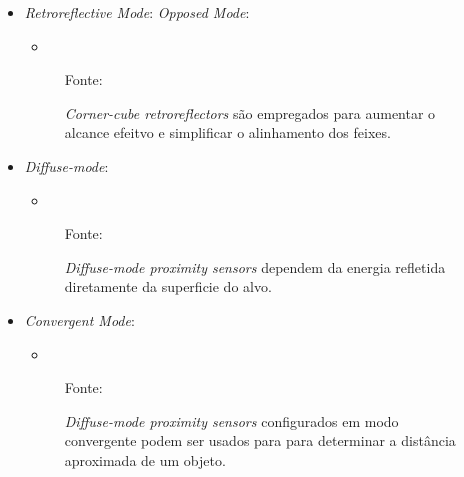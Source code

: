 \documentclass[xcolor=dvipsnames, aspectratio=169]{beamer}
\begin{document}
\begin{frame}
\begin{itemize}
		\newpage
		\item \textit{Retroreflective Mode}:
		\textit{Opposed Mode}:
		\begin{itemize}
			\item 
		\end{itemize}
		\begin{figure}
			\centering
			{Fonte: \cite{everett1995sensors}}
			\caption{\textit{Corner-cube retroreflectors} são empregados para aumentar o alcance efeitvo e simplificar o alinhamento dos feixes.}
			\label{fig:9_optical_sensor_retroreflective_mode}
		\end{figure}

		\newpage
		\item \textit{Diffuse-mode}:
		\begin{itemize}
			\item 
		\end{itemize}
		\begin{figure}
			\centering
			{Fonte: \cite{everett1995sensors}}
			\caption{\textit{Diffuse-mode proximity sensors} dependem da energia refletida diretamente da superficie do alvo.}
			\label{fig:10_optical_sensor_diffuse_mode}
		\end{figure}

		\newpage
		\item \textit{Convergent Mode}:
		\begin{itemize}
			\item 
		\end{itemize}
		\begin{figure}
			\centering
			{Fonte: \cite{everett1995sensors}}
			\caption{\textit{Diffuse-mode proximity sensors} configurados em modo convergente podem ser usados para para determinar a distância aproximada de um objeto.}
			\label{fig:11_optical_sensor_convergent_mode}
		\end{figure}
	\end{itemize}
\end{frame}
\end{document}
